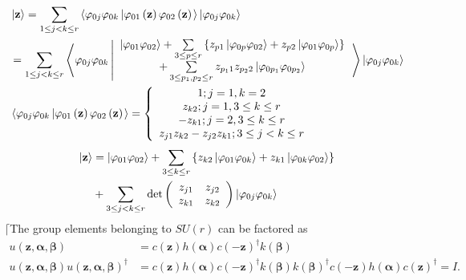 \documentclass[aps,preprint]{revtex4}%
\begin{document}
\begin{align}
&  \left\vert \mathbf{z}\right\rangle =\sum_{1\leq j<k\leq r}\left\langle
\varphi_{0j}\varphi_{0k}\left\vert \varphi_{01}\left(  \mathbf{z}\right)
\varphi_{02}\left(  \mathbf{z}\right)  \right.  \right\rangle \left\vert
\varphi_{0j}\varphi_{0k}\right\rangle \nonumber\\
&  \left.  =\right.  \sum_{1\leq j<k\leq r}\left\langle \varphi_{0j}%
\varphi_{0k}\left\vert
\begin{array}
[c]{c}%
\left\vert \varphi_{01}\varphi_{02}\right\rangle +\sum\limits_{3\leq p\leq
r}\left\{  z_{p1}\left\vert \varphi_{0p}\varphi_{02}\right\rangle
+z_{p2}\left\vert \varphi_{01}\varphi_{0p}\right\rangle \right\}  \\
+\sum\limits_{3\leq p_{1},p_{2}\leq r}z_{p_{1}1}z_{p_{2}2}\left\vert
\varphi_{0p_{1}}\varphi_{0p_{2}}\right\rangle
\end{array}
\right.  \right\rangle \left\vert \varphi_{0j}\varphi_{0k}\right\rangle
\nonumber\\
&  \left\langle \varphi_{0j}\varphi_{0k}\left\vert \varphi_{01}\left(
\mathbf{z}\right)  \varphi_{02}\left(  \mathbf{z}\right)  \right.
\right\rangle =\left\{
\begin{array}
[c]{c}%
1;j=1,k=2\\
z_{k2};j=1,3\leq k\leq r\\
-z_{k1};j=2,3\leq k\leq r\\
z_{j1}z_{k2}-z_{j2}z_{k1};3\leq j<k\leq r
\end{array}
\right.
\end{align}%
\begin{align}
\left\vert \mathbf{z}\right\rangle  &  =\left\vert \varphi_{01}\varphi
_{02}\right\rangle +\sum\limits_{3\leq k\leq r}\left\{  z_{k2}\left\vert
\varphi_{01}\varphi_{0k}\right\rangle +z_{k1}\left\vert \varphi_{0k}%
\varphi_{02}\right\rangle \right\}  \nonumber\\
&  +\sum_{3\leq j<k\leq r}\det\left(
\begin{array}
[c]{cc}%
z_{j1} & z_{j2}\\
z_{k1} & z_{k2}%
\end{array}
\right)  \left\vert \varphi_{0j}\varphi_{0k}\right\rangle
\end{align}
$\lceil$The group elements belonging to $SU\left(  r\right)  $ can be factored
as
\begin{align}
u\left(  \mathbf{z,\alpha,\beta}\right)   &  =c\left(  \mathbf{z}\right)
h\left(  \mathbf{\alpha}\right)  c\left(  -\mathbf{z}\right)  ^{\dagger
}k\left(  \mathbf{\beta}\right)  \nonumber\\
u\left(  \mathbf{z,\alpha,\beta}\right)  u\left(  \mathbf{z,\alpha,\beta
}\right)  ^{\dagger} &  =c\left(  \mathbf{z}\right)  h\left(  \mathbf{\alpha
}\right)  c\left(  -\mathbf{z}\right)  ^{\dagger}k\left(  \mathbf{\beta
}\right)  k\left(  \mathbf{\beta}\right)  ^{\dagger}c\left(  -\mathbf{z}%
\right)  h\left(  \mathbf{\alpha}\right)  c\left(  \mathbf{z}\right)
^{\dagger}=I.
\end{align}
\end{document}
